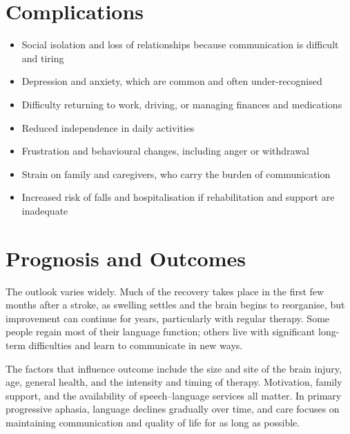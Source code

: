 \section*{Complications}
\begin{itemize}
    \item Social isolation and loss of relationships because communication is difficult and tiring
    \item Depression and anxiety, which are common and often under-recognised
    \item Difficulty returning to work, driving, or managing finances and medications
    \item Reduced independence in daily activities
    \item Frustration and behavioural changes, including anger or withdrawal
    \item Strain on family and caregivers, who carry the burden of communication
    \item Increased risk of falls and hospitalisation if rehabilitation and support are inadequate
\end{itemize}

\section*{Prognosis and Outcomes}
The outlook varies widely. Much of the recovery takes place in the first few months after a stroke, as swelling settles and the brain begins to reorganise, but improvement can continue for years, particularly with regular therapy. Some people regain most of their language function; others live with significant long-term difficulties and learn to communicate in new ways.

The factors that influence outcome include the size and site of the brain injury, age, general health, and the intensity and timing of therapy. Motivation, family support, and the availability of speech--language services all matter. In primary progressive aphasia, language declines gradually over time, and care focuses on maintaining communication and quality of life for as long as possible.

